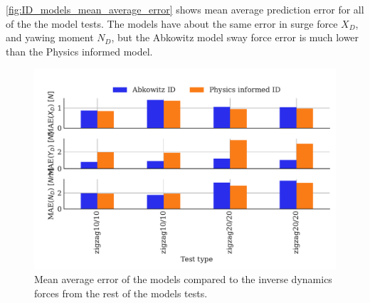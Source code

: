 \autoref{fig:ID_models_mean_average_error} shows mean average prediction error for all of the the model tests. The models have about the same error in surge force $X_D$, and yawing moment $N_D$, but the Abkowitz model sway force error is much lower than the Physics informed model. 
\begin{figure}[h]
    \begin{center}
        \includegraphics[width=\columnwidth]{figures/result_ID_regression.ID_models_mean_average_error.pdf}
        \caption{Mean average error of the models compared to the inverse dynamics
forces from the rest of the models tests.}
        \label{fig:ID_models_mean_average_error}
    \end{center}
\end{figure}

